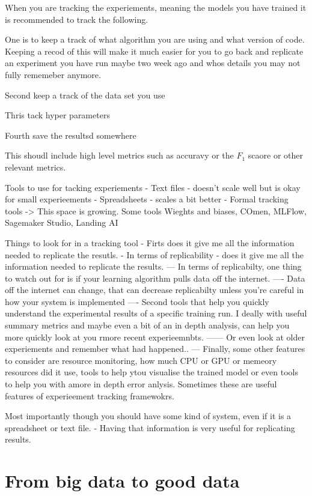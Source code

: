 When you are tracking the experiements, meaning the models you have trained it is recommended to track the following.

One is to keep a track of what algorithm you are using and what version of code.
Keeping a recod of this will make it much easier for you to go back and replicate an experiment you have run maybe two week ago and whos details you may not fully rememeber anymore.

Second keep a track of the data set you use

Thris tack hyper parameters

Fourth save the resultsd somewhere

This shoudl include high level metrics such as accuravy or the $F_1$ scaore or other relevant metrics.

Tools to use for tacking experiements
- Text files  - doesn't scale well but is okay for small experieements
- Spreadsheets - scales a bit better
- Formal tracking tools
-> This space is growing. Some tools Wieghts and biases, COmen, MLFlow, Sagemaker Studio, Landing AI

Things to look for in a tracking tool
- Firts does it give me all the information needed to replicate the resutls.
- In terms of replicability - does it give me all the information needed to replicate the results.
--- In terms of replicabilty, one thing to watch out for is if your learning algorithm pulls data off the internet.
---- Data off the internet can change, that can decrease replicabilty unless you're careful in how your system is implemented
---- Second tools that help you quickly understand the experimental results of a specific training run. I deally with useful summary metrics and maybe even a bit of an in depth analysis, can help you more quickly look at you rmore recent experieemnbts.
------ Or even look at older experiements and remember what had happened..
--- Finally, some other features to consider are resource monitoring, how much CPU or GPU or memeory resources did it use, tools to help ytou visualise the trained model or even tools to help you with amore in depth error anlysis. Sometimes these are useful features of experieement tracking framewokrs.

Most importantly though you should have some kind of system, even if it is a spreadsheet or text file.
- Having that information is very useful for replicating results.



\section{From big data to good data}

